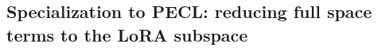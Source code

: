 \documentclass{article}
\theoremstyle{plain}
\theoremstyle{definition}
\theoremstyle{remark}
\begin{document}



\subsection{Specialization to PECL: reducing full space terms to the LoRA subspace}
\label{sec:kl-decomp-pecl}





\end{document}
